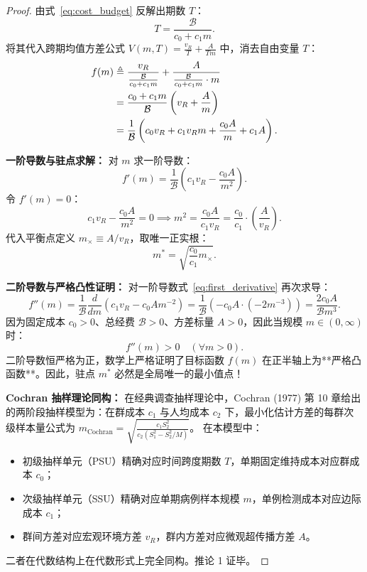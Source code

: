 \begin{proof}
由式~\eqref{eq:cost_budget} 反解出期数 $T$：
\begin{equation}
T = \frac{\mathcal{B}}{c_0 + c_1 m}.
\end{equation}
将其代入跨期均值方差公式 $V(m, T) = \frac{v_R}{T} + \frac{A}{T m}$ 中，消去自由变量 $T$：
\begin{align}
f(m) &\triangleq \frac{v_R}{\frac{\mathcal{B}}{c_0 + c_1 m}} + \frac{A}{\frac{\mathcal{B}}{c_0 + c_1 m} \cdot m} \notag \\
&= \frac{c_0 + c_1 m}{\mathcal{B}} \left( v_R + \frac{A}{m} \right) \notag \\
&= \frac{1}{\mathcal{B}} \left( c_0 v_R + c_1 v_R m + \frac{c_0 A}{m} + c_1 A \right). \label{eq:variance_objective}
\end{align}

\textbf{一阶导数与驻点求解：}
对 $m$ 求一阶导数：
\begin{equation}
f'(m) = \frac{1}{\mathcal{B}} \left( c_1 v_R - \frac{c_0 A}{m^2} \right). \label{eq:first_derivative}
\end{equation}
令 $f'(m) = 0$：
\begin{equation}
c_1 v_R - \frac{c_0 A}{m^2} = 0 \implies m^2 = \frac{c_0 A}{c_1 v_R} = \frac{c_0}{c_1} \cdot \left( \frac{A}{v_R} \right).
\end{equation}
代入平衡点定义 $m_\times \equiv A / v_R$，取唯一正实根：
\begin{equation}
m^* = \sqrt{\frac{c_0}{c_1} m_\times}.
\end{equation}

\textbf{二阶导数与严格凸性证明：}
对一阶导数式~\eqref{eq:first_derivative} 再次求导：
\begin{equation}
f''(m) = \frac{1}{\mathcal{B}} \frac{d}{dm}\left( c_1 v_R - c_0 A m^{-2} \right) = \frac{1}{\mathcal{B}} \left( - c_0 A \cdot (-2 m^{-3}) \right) = \frac{2 c_0 A}{\mathcal{B} m^3}. \label{eq:second_derivative}
\end{equation}
因为固定成本 $c_0 > 0$、总经费 $\mathcal{B} > 0$、方差标量 $A > 0$，因此当规模 $m \in (0, \infty)$ 时：
\begin{equation}
f''(m) > 0 \quad (\forall m > 0).
\end{equation}
二阶导数恒严格为正，数学上严格证明了目标函数 $f(m)$ 在正半轴上为**严格凸函数**。因此，驻点 $m^*$ 必然是全局唯一的最小值点！

\textbf{Cochran 抽样理论同构：}
在经典调查抽样理论中，Cochran (1977) 第 10 章给出的两阶段抽样模型为：在群成本 $c_1$ 与人均成本 $c_2$ 下，最小化估计方差的每群次级样本量公式为 $m_{\text{Cochran}} = \sqrt{\frac{c_1 S_2^2}{c_2 (S_1^2 - S_2^2/M)}}$。
在本模型中：
\begin{itemize}
    \item 初级抽样单元（PSU）精确对应时间跨度期数 $T$，单期固定维持成本对应群成本 $c_0$；
    \item 次级抽样单元（SSU）精确对应单期病例样本规模 $m$，单例检测成本对应边际成本 $c_1$；
    \item 群间方差对应宏观环境方差 $v_R$，群内方差对应微观超传播方差 $A$。
\end{itemize}
二者在代数结构上在代数形式上完全同构。推论 1 证毕。
\end{proof}
